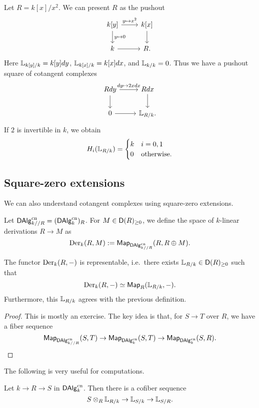 \documentclass{amsart}
\begin{document}
\begin{ex}
	Let $R = k[x] / x^2$.
	We can present $R$ as the pushout
	\[
		\begin{tikzcd}
			k[y] \rar["y \mapsto x^2"] \dar["y \mapsto 0"] & k[x] \dar \\
			k \rar & R.
		\end{tikzcd}
	\]
	Here $\mathbb{L}_{k[y]/k} = k[y] dy$, $\mathbb{L}_{k[x]/k} = k[x] dx$, and $\mathbb{L}_{k/k} = 0$.
	Thus we have a pushout square of cotangent complexes
	\[
		\begin{tikzcd}
			R dy \rar["dy \mapsto 2x dx"] \dar & R dx \dar \\
			0 \rar & \LL_{R/k}.
		\end{tikzcd}
	\]
	If $2$ is invertible in $k$, we obtain
	\[
		H_i(\mathbb{L}_{R/k}) = \begin{cases}
			k & i = 0, 1 \\
			0 & \textrm{otherwise.}
		\end{cases}
	\]
\end{ex}

\subsection{Square-zero extensions}

We can also understand cotangent complexes using square-zero extensions.

Let $\mathsf{DAlg}_{k//R}^{\mathrm{cn}} = (\mathsf{DAlg}_k^{\mathrm{cn}})_R$.
For $M \in \mathsf{D}(R)_{\geq 0}$, we define the space of $k$-linear derivations $R \to M$ as
\[
	\operatorname{Der}_k(R, M) := \mathsf{Map}_{\mathsf{DAlg}_{k//R}^{\mathrm{cn}}}(R, R \oplus M).
\]

\begin{prop}
	The functor $\operatorname{Der}_k(R, -)$ is representable, i.e.\ there exists $\mathbb{L}_{R/k} \in \mathsf{D}(R)_{\geq 0}$ such that
	\[
		\operatorname{Der}_k(R, -) \simeq \mathsf{Map}_R(\mathbb{L}_{R/k}, -).
	\]
	Furthermore, this $\mathbb{L}_{R/k}$ agrees with the previous definition.
\end{prop}

\begin{proof}
	This is mostly an exercise.
	The key idea is that, for $S \to T$ over $R$, we have a fiber sequence
	\[
		\mathsf{Map}_{\mathsf{DAlg}_{k//R}^{\mathrm{cn}}}(S, T) \to \mathsf{Map}_{\mathsf{DAlg}_k^{\mathrm{cn}}}(S, T) \to \mathsf{Map}_{\mathsf{DAlg}_k^{\mathrm{cn}}}(S, R).
	\]
\end{proof}

The following is very useful for computations.

\begin{exer}
	Let $k \to R \to S$ in $\mathsf{DAlg}_k^{\mathrm{cn}}$.
	Then there is a cofiber sequence
	\[
		S \otimes_R \mathbb{L}_{R/k} \to \mathbb{L}_{S/k} \to \mathbb{L}_{S/R}.
	\]
\end{exer}
\end{document}
